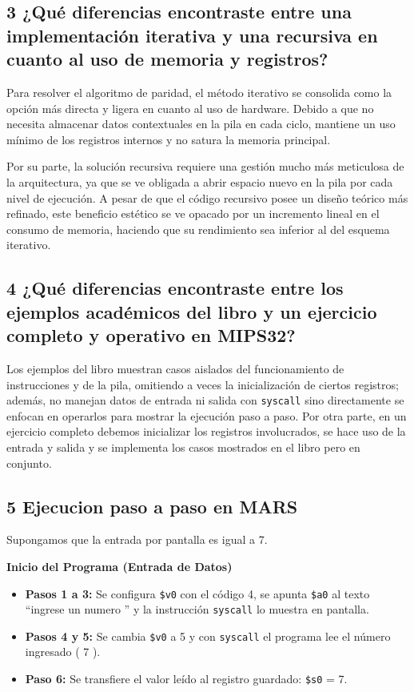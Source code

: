 \documentclass[12pt,a4paper]{article}
\begin{document}
\subsection*{3 ¿Qué diferencias encontraste entre una implementación iterativa y una recursiva en cuanto al uso de memoria y registros?}
Para resolver el algoritmo de paridad, el método iterativo se consolida como la opción más directa y ligera en cuanto al uso de hardware. Debido a que no necesita almacenar datos contextuales en la pila en cada ciclo, mantiene un uso mínimo de los registros internos y no satura la memoria principal.

Por su parte, la solución recursiva requiere una gestión mucho más meticulosa de la arquitectura, ya que se ve obligada a abrir espacio nuevo en la pila por cada nivel de ejecución. A pesar de que el código recursivo posee un diseño teórico más refinado, este beneficio estético se ve opacado por un incremento lineal en el consumo de memoria, haciendo que su rendimiento sea inferior al del esquema iterativo.

\subsection*{4 ¿Qué diferencias encontraste entre los ejemplos académicos del libro y un ejercicio completo y operativo en MIPS32?}
Los ejemplos del libro muestran casos aislados del funcionamiento de instrucciones y de la pila, omitiendo a veces la inicialización de ciertos registros; además, no manejan datos de entrada ni salida con \texttt{syscall} sino directamente se enfocan en operarlos para mostrar la ejecución paso a paso. Por otra parte, en un ejercicio completo debemos inicializar los registros involucrados, se hace uso de la entrada y salida y se implementa los casos mostrados en el libro pero en conjunto.

\subsection*{5 Ejecucion paso a paso en MARS}
Supongamos que la entrada por pantalla es igual a 7.

\textbf{Inicio del Programa (Entrada de Datos)}
\begin{itemize}
    \item \textbf{Pasos 1 a 3:} Se configura \texttt{\$v0} con el código 4, se apunta \texttt{\$a0} al texto ``ingrese un numero '' y la instrucción \texttt{syscall} lo muestra en pantalla.
    \item \textbf{Pasos 4 y 5:} Se cambia \texttt{\$v0} a 5 y con \texttt{syscall} el programa lee el número ingresado ( 7 ).
    \item \textbf{Paso 6:} Se transfiere el valor leído al registro guardado: \texttt{\$s0} = 7.
\end{itemize}
\end{document}
